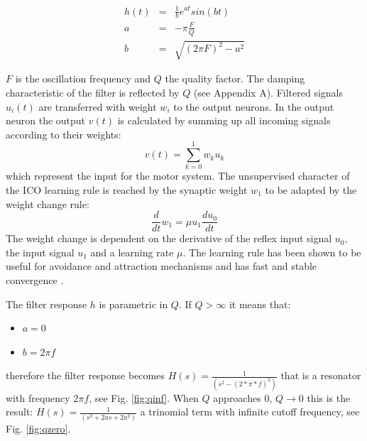 \begin{eqnarray}
h(t)&=&\frac{1}{b}e^{at}sin(bt)\\
a&=&-\pi \frac{F}{Q}\\
b&=&\sqrt{(2\pi F)^2 -a^{2}}
\end{eqnarray}

$F$ is the oscillation frequency and $Q$ the quality factor.
The damping characteristic of the filter is reflected by $Q$ (see Appendix A).
Filtered signals $u_{i}(t)$ are transferred with weight $w_{i}$ to the output
neurons. In the output neuron the output $v(t)$ is calculated by
summing up all incoming signals according to their weights:
\begin{equation}
v(t)=\sum_{k=0}^{1}w_{k}u_{k}
\end{equation}
which represent the input for the motor system.
The unsupervised character of the ICO learning rule is reached by
the synaptic weight $w_{1}$ to be adapted by the weight
change rule:
\begin{equation}
\frac{d}{dt}w_{1}=\mu u_{1} \frac{d u_{0}}{dt}
\end{equation}
The weight change is dependent on the derivative of the reflex input
signal $u_{0}$, the input signal $u_{1}$ and a
learning rate $\mu$. The
learning rule has been shown to be useful for avoidance and attraction
mechanisms and has fast and stable convergence \citep{Porr2006ICO}.

The filter response $h$ is parametric in $Q$.
If $Q>\infty$ it means that:
\begin{itemize}
\item $a=0$
\item $b=2 \pi f$
\end{itemize}
therefore the filter response becomes
$H(s)=\frac{1}{(s^2-(2* \pi *f)^2)}$
that is a resonator with frequency $2 \pi f$, see Fig. \ref{fig:qinf}.
When $Q$ approaches 0, $Q \rightarrow 0$ this is the result:
$H(s)=\frac{1}{(s^2+2as+2a^2)}$
a trinomial term with infinite cutoff frequency, see Fig. \ref{fig:qzero}.


